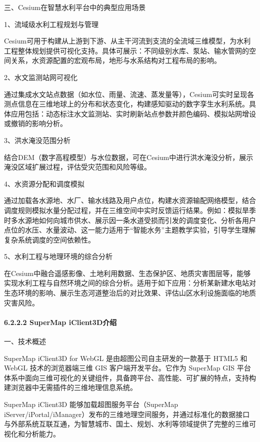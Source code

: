 三、Cesium在智慧水利平台中的典型应用场景

1、流域级水利工程规划与管理

Cesium可用于构建从上游到下游、从主干河流到支流的全流域三维模型，为水利工程整体规划提供可视化支持。具体可展示：不同级别水库、泵站、输水管网的空间关系，水资源配置的宏观布局，地形与水系结构对工程布局的影响。

2、水文监测站网可视化

通过集成水文站点数据（如水位、雨量、流速、蒸发量等），Cesium可实时呈现各测点信息在三维地球上的分布和状态变化，构建感知驱动的数字孪生水利系统。具体应用包括：动态标注水文监测站、实时刷新站点参数并颜色编码、模拟站网增设或撤销的影响分析。

3、洪水淹没范围分析

结合DEM（数字高程模型）与水位数据，可在Cesium中进行洪水淹没分析，展示淹没区域扩展过程，评估受灾范围和风险等级。

4、水资源分配和调度模拟

通过加载各水源地、水厂、输水线路及用户点位，构建水资源输配网络模型，结合调度规则模拟水量分配过程，并在三维空间中实时反馈运行结果。例如：模拟旱季时多水源地如何向城市供水、展示因一条水道受损而引发的调度变化、分析各用户点位的水压、水量波动、这一能力适用于``智能水务''主题教学实验，引导学生理解复杂系统调度的空间依赖性。

5、水利工程与地理环境的综合分析

在Cesium中融合遥感影像、土地利用数据、生态保护区、地质灾害图层等，能够实现水利工程与自然环境之间的综合分析。适用于如下应用：分析某新建水电站对生态环境的影响、展示生态河道整治后的对比效果、评估山区水利设施面临的地质灾害风险。

\hypertarget{supermap-iclient3dux4ecbux7ecd}{%
\paragraph{6.2.2.2 SuperMap iClient3D介绍}\label{supermap-iclient3dux4ecbux7ecd}}

一、技术概述

SuperMap iClient3D for WebGL 是由超图公司自主研发的一款基于 HTML5 和 WebGL 技术的浏览器端三维 GIS 客户端开发平台。它作为 SuperMap GIS 平台体系中面向三维可视化的关键组件，具备跨平台、高性能、可扩展的特点，支持构建浏览器中无需插件的三维地理信息系统。

SuperMap iClient3D 能够加载超图服务平台（SuperMap iServer/iPortal/iManager）发布的三维地理空间服务，并通过标准化的数据接口与外部系统互联互通，为智慧城市、国土、规划、水利等领域提供了完整的三维可视化和分析能力。

